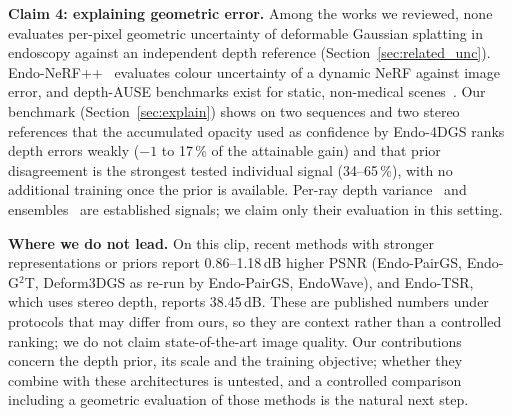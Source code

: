 \documentclass[conference]{IEEEtran}
\begin{document}
\textbf{Claim 4: explaining geometric error.} Among the works we reviewed, none evaluates per-pixel geometric uncertainty of deformable Gaussian splatting in endoscopy against an independent depth reference (Section~\ref{sec:related_unc}). Endo-NeRF++~\cite{habib2026endonerfpp} evaluates colour uncertainty of a dynamic NeRF against image error, and depth-AUSE benchmarks exist for static, non-medical scenes~\cite{goli2023bayesrays,jiang2023fisherrf,ewen2025moments,safadoust2025warprf}. Our benchmark (Section~\ref{sec:explain}) shows on two sequences and two stereo references that the accumulated opacity used as confidence by Endo-4DGS ranks depth errors weakly ($-1$ to 17\,\% of the attainable gain) and that prior disagreement is the strongest tested individual signal (34--65\,\%), with no additional training once the prior is available. Per-ray depth variance~\cite{ewen2025moments} and ensembles~\cite{klasson2024sources} are established signals; we claim only their evaluation in this setting.

\textbf{Where we do not lead.} On this clip, recent methods with stronger representations or priors report 0.86--1.18\,dB higher PSNR (Endo-PairGS, Endo-G$^2$T, Deform3DGS as re-run by Endo-PairGS, EndoWave), and Endo-TSR, which uses stereo depth, reports 38.45\,dB. These are published numbers under protocols that may differ from ours, so they are context rather than a controlled ranking; we do not claim state-of-the-art image quality. Our contributions concern the depth prior, its scale and the training objective; whether they combine with these architectures is untested, and a controlled comparison including a geometric evaluation of those methods is the natural next step.



\end{document}
